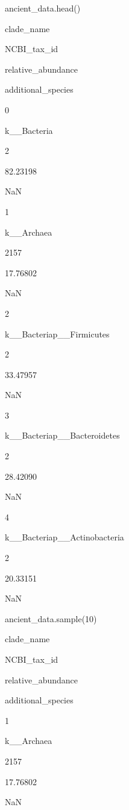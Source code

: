 \documentclass[
  letterpaper,
]{book}
\newenvironment{Shaded}{}{}
\newcommand{\DecValTok}[1]{\textcolor[rgb]{0.00,0.36,0.77}{#1}}
\newcommand{\NormalTok}[1]{\textcolor[rgb]{0.14,0.16,0.18}{#1}}
\begin{document}
\begin{Shaded}
\begin{Highlighting}[]
\NormalTok{ancient\_data.head()}
\end{Highlighting}
\end{Shaded}

clade\_name

NCBI\_tax\_id

relative\_abundance

additional\_species

0

k\_\_Bacteria

2

82.23198

NaN

1

k\_\_Archaea

2157

17.76802

NaN

2

k\_\_Bacteria\textbar p\_\_Firmicutes

2

33.47957

NaN

3

k\_\_Bacteria\textbar p\_\_Bacteroidetes

2

28.42090

NaN

4

k\_\_Bacteria\textbar p\_\_Actinobacteria

2

20.33151

NaN

\begin{Shaded}
\begin{Highlighting}[]
\NormalTok{ancient\_data.sample(}\DecValTok{10}\NormalTok{)}
\end{Highlighting}
\end{Shaded}

clade\_name

NCBI\_tax\_id

relative\_abundance

additional\_species

1

k\_\_Archaea

2157

17.76802

NaN
\end{document}
